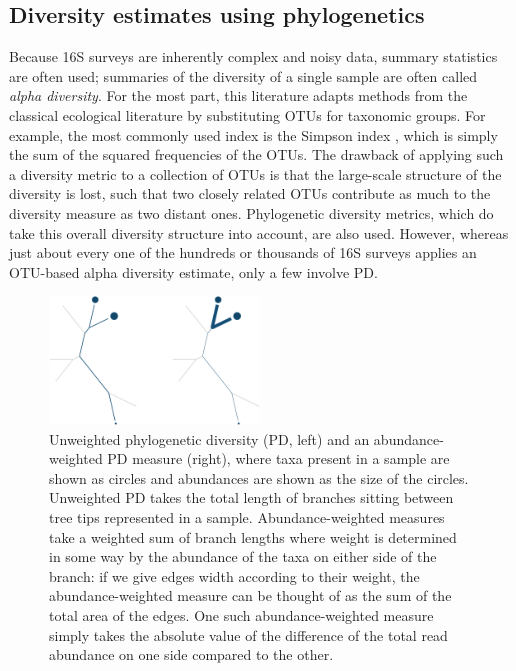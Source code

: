 \documentclass{amsart}
\newcommand{\forarxiv}[1]{#1}
\begin{document}
\subsection{Diversity estimates using phylogenetics}

Because 16S surveys are inherently complex and noisy data, summary statistics are often used; summaries of the diversity of a single sample are often called \emph{alpha diversity}.
For the most part, this literature adapts methods from the classical ecological literature by substituting OTUs for taxonomic groups.
For example, the most commonly used index is the Simpson index \citep{simpson1949measurement}, which is simply the sum of the squared frequencies of the OTUs.
The drawback of applying such a diversity metric to a collection of OTUs is that the large-scale structure of the diversity is lost, such that two closely related OTUs contribute as much to the diversity measure as two distant ones.
Phylogenetic diversity metrics, which do take this overall diversity structure into account, are also used.
However, whereas just about every one of the hundreds or thousands of 16S surveys applies an OTU-based alpha diversity estimate, only a few involve PD.

\newcommand{\pdLegend}{
    Unweighted phylogenetic diversity (PD, left) and an abundance-weighted PD measure (right), where taxa present in a sample are shown as circles and abundances are shown as the size of the circles.
    Unweighted PD takes the total length of branches sitting between tree tips represented in a sample.
    Abundance-weighted measures take a weighted sum of branch lengths where weight is determined in some way by the abundance of the taxa on either side of the branch: if we give edges width according to their weight, the abundance-weighted measure can be thought of as the sum of the total area of the edges.
    One such abundance-weighted measure simply takes the absolute value of the difference of the total read abundance on one side compared to the other.
}
\forarxiv{
\begin{figure}
  \vspace{-25pt}
  \begin{center}
    \includegraphics[width=2.2in]{figures/pd.pdf}
  \end{center}
  \vspace{-10pt}
  \caption{\pdLegend}
  \label{fig:pd}
\end{figure}
}
\end{document}
